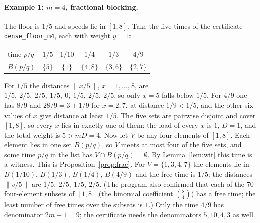 \documentclass[11pt]{article}
\theoremstyle{remark}
\newcommand{\norm}[1]{\lVert #1\rVert}
\begin{document}
\paragraph{Example 1: $m=4$, fractional blocking.} The floor is $1/5$ and speeds lie in $[1,8]$. Take the five times of the certificate \texttt{dense\_floor\_m4}, each with weight $y=1$:
\begin{center}
\begin{tabular}{lccccc}
\toprule
time $p/q$ & $1/5$ & $1/10$ & $1/4$ & $1/3$ & $4/9$\\
$B(p/q)$ & $\{5\}$ & $\{1\}$ & $\{4,8\}$ & $\{3,6\}$ & $\{2,7\}$\\
\bottomrule
\end{tabular}
\end{center}
For $1/5$ the distances $\norm{x/5}$, $x=1,\dots,8$, are $1/5,\ 2/5,\ 2/5,\ 1/5,\ 0,\ 1/5,\ 2/5,\ 2/5$, so only $x=5$ falls below $1/5$. For $4/9$ one has $8/9$ and $28/9=3+1/9$ for $x=2,7$, at distance $1/9<1/5$, and the other six values of $x$ give distance at least $1/5$. The five sets are pairwise disjoint and cover $[1,8]$, so every $x$ lies in exactly one of them: the load of every $x$ is $1$, $D=1$, and the total weight is $5>mD=4$. Now let $V$ be any four elements of $[1,8]$. Each element lies in one set $B(p/q)$, so $V$ meets at most four of the five sets, and some time $p/q$ in the list has $V\cap B(p/q)=\emptyset$. By Lemma~\ref{lem:wit} this time is a witness. This is Proposition~\ref{prop:frac}. For $V=\{1,3,4,7\}$ the elements lie in $B(1/10)$, $B(1/3)$, $B(1/4)$, $B(4/9)$ and the free time is $1/5$: the distances $\norm{v/5}$ are $1/5,\ 2/5,\ 1/5,\ 2/5$. (The program also confirmed that each of the $70$ four-element subsets of $[1,8]$ (the binomial coefficient $\binom{8}{4}$) has a free time; the least number of free times over the subsets is $1$.) Only the time $4/9$ has denominator $2m+1=9$; the certificate needs the denominators $5,10,4,3$ as well.
\end{document}
